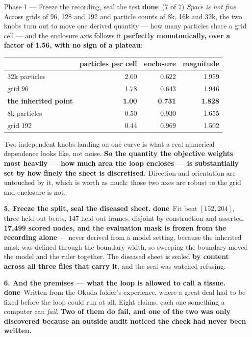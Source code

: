 \documentclass[11pt,a4paper]{article}
\newcommand{\dn}{\textcolor{good}{\textbf{done}}}
\begin{document}
\begin{phasebox}{Phase 1 --- Freeze the recording, seal the test \hfill \dn\ (7 of 7)}
\emph{Space is not fine.} Across grids of 96, 128 and 192 and particle counts of 8k, 16k and 32k,
the two knobs turn out to move one derived quantity --- how many particles share a grid cell --- and
the enclosure axis follows it \textbf{perfectly monotonically, over a factor of 1.56, with no sign
of a plateau}:

\begin{center}\small
\begin{tabular}{@{}l r r r@{}}
\toprule
& \textbf{particles per cell} & \textbf{enclosure} & \textbf{magnitude}\\
\midrule
32k particles & 2.00 & 0.622 & 1.959\\
grid 96 & 1.78 & 0.643 & 1.946\\
\textbf{the inherited point} & \textbf{1.00} & \textbf{0.731} & \textbf{1.828}\\
8k particles & 0.50 & 0.930 & 1.655\\
grid 192 & 0.44 & 0.969 & 1.502\\
\bottomrule
\end{tabular}
\end{center}

Two independent knobs landing on one curve is what a real numerical dependence looks like, not
noise. \textbf{So the quantity the objective weights most heavily --- how much area the loop
encloses --- is substantially set by how finely the sheet is discretised.} Direction and orientation
are untouched by it, which is worth as much: those two axes are robust to the grid and enclosure is
not.

\textbf{5. Freeze the split, seal the diseased sheet.} \dn\ Fit beat $[152, 204]$, three held-out
beats, 147 held-out frames, disjoint by construction and asserted. \textbf{17{,}499 scored nodes,
and the evaluation mask is frozen from the recording alone} --- never derived from a model setting,
because the inherited mask was defined through the boundary width, so sweeping the boundary moved
the model and the ruler together. The diseased sheet is sealed \textbf{by content across all three
files that carry it}, and the seal was watched refusing.

\textbf{6. And the premises --- what the loop is allowed to call a tissue.} \dn\ Written from the
Okuda folder's experience, where a great deal had to be fixed before the loop could run at all.
Eight claims, each one something a computer can \emph{fail}. \textbf{Two of them do fail, and one
of the two was only discovered because an outside audit noticed the check had never been written.}


\end{phasebox}
\end{document}
